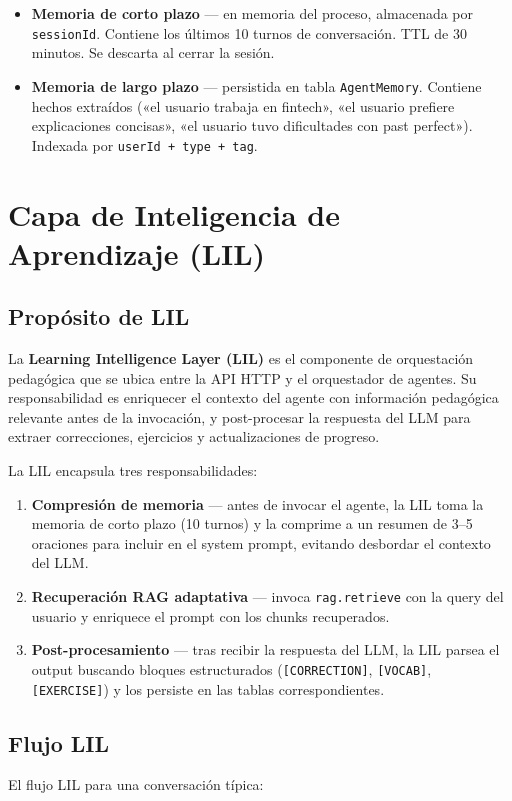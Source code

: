 \documentclass[10pt,a4paper,oneside]{report}
\begin{document}
\begin{itemize}[leftmargin=1.4em]
\item \textbf{Memoria de corto plazo} — en memoria del proceso, almacenada por \texttt{sessionId}. Contiene los últimos 10 turnos de conversación. TTL de 30 minutos. Se descarta al cerrar la sesión.
\item \textbf{Memoria de largo plazo} — persistida en tabla \texttt{AgentMemory}. Contiene hechos extraídos («el usuario trabaja en fintech», «el usuario prefiere explicaciones concisas», «el usuario tuvo dificultades con past perfect»). Indexada por \texttt{userId + type + tag}.
\end{itemize}

\chapter{Capa de Inteligencia de Aprendizaje (LIL)}

\section{Propósito de LIL}
La \textbf{Learning Intelligence Layer (LIL)} es el componente de orquestación pedagógica que se ubica entre la API HTTP y el orquestador de agentes. Su responsabilidad es enriquecer el contexto del agente con información pedagógica relevante antes de la invocación, y post-procesar la respuesta del LLM para extraer correcciones, ejercicios y actualizaciones de progreso.

La LIL encapsula tres responsabilidades:

\begin{enumerate}[leftmargin=1.6em]
\item \textbf{Compresión de memoria} — antes de invocar el agente, la LIL toma la memoria de corto plazo (10 turnos) y la comprime a un resumen de 3--5 oraciones para incluir en el system prompt, evitando desbordar el contexto del LLM.
\item \textbf{Recuperación RAG adaptativa} — invoca \texttt{rag.retrieve} con la query del usuario y enriquece el prompt con los chunks recuperados.
\item \textbf{Post-procesamiento} — tras recibir la respuesta del LLM, la LIL parsea el output buscando bloques estructurados (\texttt{[CORRECTION]}, \texttt{[VOCAB]}, \texttt{[EXERCISE]}) y los persiste en las tablas correspondientes.
\end{enumerate}

\section{Flujo LIL}
El flujo LIL para una conversación típica:
\end{document}
